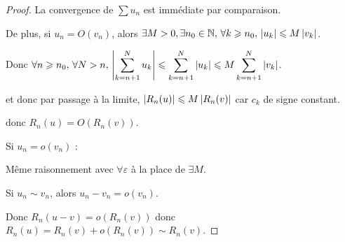 \begin{proof}
    La convergence de $\sum u_n$ est immédiate par comparaison. 

    De plus, si $u_n =  O(v_n)$, alors $\exists M > 0, \exists n_0 \in \mathbb{N}, \, \forall k \geqslant n_0, \, \left|u_k\right| \leqslant M \left|v_k\right|$.

    Donc $\displaystyle \forall n \geqslant n_0, \, \forall N > n, \, \left|\sum_{k = n + 1 }^{N } u_k\right| \leqslant \sum_{k = n + 1 }^{N } \left|u_k\right| \leqslant M \sum_{k = n + 1}^{N } \left|v_k\right|$.

    et donc par passage à la limite, $\left|R_n(u)\right| \leqslant M \left|R_n(v)\right|$ car $c_k$ de signe constant. 

    donc $R_n(u) = O(R_n(v))$.

    \lvspace Si $u_n = o(v_n)$ : 

    Même raisonnement avec $\forall \varepsilon$ à la place de $\exists M$. 

    \lvspace Si $u_n \sim v_n$, alors $u_n - v_n = o(v_n)$. 

    Donc $R_n(u - v) = o(R_n(v))$ donc $R_n(u) = R_n(v) + o(R_n(v)) \sim R_n(v)$.
\end{proof}


